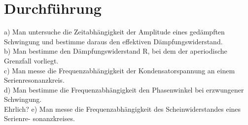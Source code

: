 \section{Durchführung}
\label{sec:Durchfuehrung}

a) Man untersuche die Zeitabhängigkeit der Amplitude eines gedämpften Schwingung und bestimme daraus den effektiven Dämpfungswiderstand.\\
b) Man bestimme den Dämpfungswiderstand R, bei dem der aperiodische Grenzfall vorliegt.\\
c) Man messe die Frequenzabhängigkeit der Kondensatorspannung an einem Serienresonanzkreis.\\
d) Man bestimme die Frequenzabhängigkeit den Phasenwinkel bei erzwungener Schwingung.\\
Ehrlich? e) Man messe die Frequenzabhängigkeit des Scheinwiderstandes eines Serienre- sonanzkreises.





